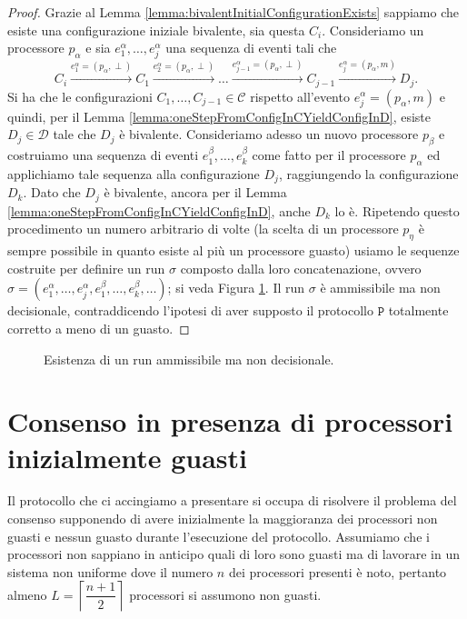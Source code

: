 \documentclass{article}
\begin{document}
\begin{proof}
Grazie al Lemma \ref{lemma:bivalentInitialConfigurationExists}
sappiamo che esiste una configurazione iniziale bivalente, sia questa
$C_i$. Consideriamo un processore $p_{\alpha}$ e sia
$e_1^{\alpha},\ldots,e_j^{\alpha}$ una sequenza di eventi tali che
$$C_i \xrightarrow{e_1^{\alpha}=(p_{\alpha},\perp)} C_1
\xrightarrow{e_2^{\alpha}=(p_{\alpha},\perp)} \ldots
\xrightarrow{e_{j-1}^{\alpha}=(p_{\alpha},\perp)} C_{j-1}
\xrightarrow{e_j^{\alpha}=(p_{\alpha},m)} D_{j}.$$ Si ha che le
configurazioni $C_1, \ldots, C_{j-1} \in \mathcal{C}$ rispetto
all'evento $e_j^{\alpha}=(p_{\alpha},m)$ e quindi, per il Lemma
\ref{lemma:oneStepFromConfigInCYieldConfigInD}, esiste $D_j \in
\mathcal{D}$ tale che $D_j$ è bivalente. Consideriamo adesso un nuovo
processore $p_{\beta}$ e costruiamo una sequenza di eventi
$e_1^{\beta},\ldots,e_k^{\beta}$ come fatto per il processore
$p_{\alpha}$ ed applichiamo tale sequenza alla configurazione $D_j$,
raggiungendo la configurazione $D_k$. Dato che $D_j$ è bivalente,
ancora per il Lemma \ref{lemma:oneStepFromConfigInCYieldConfigInD},
anche $D_k$ lo è. Ripetendo questo procedimento un numero arbitrario
di volte (la scelta di un processore $p_{\eta}$ è sempre possibile in
quanto esiste al più un processore guasto) usiamo le sequenze
costruite per definire un run $\sigma$ composto dalla loro
concatenazione, ovvero $\sigma =
(e_1^{\alpha},\ldots,e_j^{\alpha},e_1^{\beta},\ldots,e_k^{\beta},\ldots)$;
si veda Figura \ref{fig:serpente}. Il run $\sigma$ è ammissibile ma
non decisionale, contraddicendo l'ipotesi di aver supposto il
protocollo $\mathtt{P}$ totalmente corretto a meno di un guasto.
\end{proof}


\begin{figure}[!h]
  \centering \caption{Esistenza di un run
    ammissibile ma non decisionale.}\label{fig:serpente}
\end{figure}
\newpage
\section{Consenso in presenza di processori inizialmente guasti}

Il protocollo che ci accingiamo a presentare si occupa di risolvere il
problema del consenso supponendo di avere inizialmente la maggioranza
dei processori non guasti e nessun guasto durante l'esecuzione del
protocollo. Assumiamo che i processori non sappiano in anticipo quali
di loro sono guasti ma di lavorare in un sistema non uniforme dove il
numero $n$ dei processori presenti è noto, pertanto almeno
$L=\left\lceil\dfrac{n+1}{2}\right\rceil$ processori si assumono non
guasti. 
\end{document}
